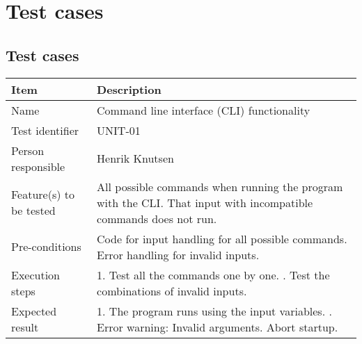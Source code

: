  

\chapter{Test cases}
	\setcounter{tocdepth}{1}

	\section{Test cases}
		\vspace{8 mm}		

		\begin{center}
			\begin{tabular}{ |  p{3.5cm} | p{10cm} | }
				\hline
				Item & Description \\ [5pt] \hline \hline
				Name & Command line interface (CLI) functionality \\  [5pt] \hline
				Test identifier & UNIT-01 \\  [5pt] \hline
				Person responsible & Henrik Knutsen \\  [5pt] \hline
				Feature(s) to be tested & All possible commands when running the program with the CLI. That input with incompatible commands does not run. \\  [5pt] \hline
				Pre-conditions & Code for input handling for all possible commands. Error handling for invalid inputs. \\  [5pt] \hline
				Execution steps & 1. Test all the commands one by one. \newline 2. Test the combinations of invalid inputs. \\  [5pt] \hline
				Expected result & 1. The program runs using the input variables. \newline 2. Error warning: Invalid arguments. Abort startup. \\  [5pt] \hline
			\end{tabular}
		\end{center}

